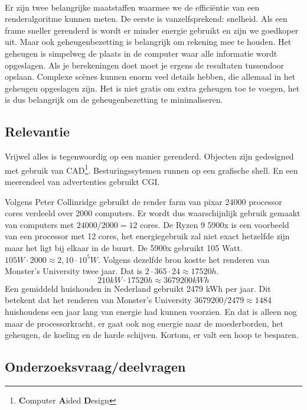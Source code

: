 \documentclass[12pt, a4paper]{article}
\begin{document}
\paragraph{}
Er zijn twee belangrijke maatstaffen waarmee we de efficiëntie van een renderalgoritme kunnen meten. De eerste is vanzelfsprekend: snelheid. Als een frame sneller gerenderd is wordt er minder energie gebruikt en zijn we goedkoper uit. Maar ook geheugenbezetting is belangrijk om rekening mee te houden. Het geheugen is simpelweg de plaats in de computer waar alle informatie wordt opgeslagen. Als je berekeningen doet moet je ergens de resultaten tussendoor opslaan. Complexe scènes kunnen enorm veel details hebben, die allemaal in het geheugen opgeslagen zijn. Het is niet gratis om extra geheugen toe te voegen, het is dus belangrijk om de geheugenbezetting te minimaliseren. 
\subsection{Relevantie}
Vrijwel alles is tegenwoordig op een manier gerenderd. Objecten zijn gedesigned met gebruik van CAD\footnote{\textbf{C}omputer \textbf{A}ided \textbf{D}esign}. Besturingssytemen runnen op een grafische shell. En een meerendeel van advertenties gebruikt CGI.

Volgens Peter Collinridge\cite{ScienceBehindPixarRendering} gebruikt de render farm van pixar 24000 processor cores verdeeld over 2000 computers. Er wordt dus waarschijnlijk gebruik gemaakt van computers met \(24000/2000=12\) cores. De Ryzen 9 5900x is een voorbeeld van een processor met 12 cores, het energiegebruik zal niet exact hetzelfde zijn maar het ligt bij elkaar in de buurt. De 5900x gebruikt 105 Watt. \(105W\cdot 2000\approx 2,10\cdot 10^5W\). Volgens dezelfde bron kostte het renderen van Monster's University twee jaar. Dat is \(2\cdot 365\cdot 24\approx17520h\). \[210kW \cdot 17520h\approx 3679200kWh\] Een gemiddeld huishouden in Nederland gebruikt 2479 kWh per jaar. Dit betekent dat het renderen van Monster's University \(3679200/2479\approx 1484\) huishoudens een jaar lang van energie had kunnen voorzien. En dat is alleen nog maar de processorkracht, er gaat ook nog energie naar de moederborden, het geheugen, de koeling en de harde schijven. Kortom, er valt een hoop te besparen.
\subsection{Onderzoeksvraag/deelvragen}
\end{document}

